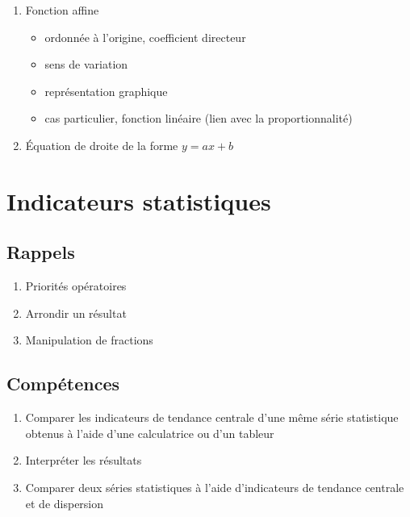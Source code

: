 \documentclass[12pt,a4paper]{article}
\begin{document}
\begin{enumerate}
	
	\item Fonction affine
	\begin{itemize}
		\item ordonnée à l'origine, coefficient directeur
		\item sens de variation
		\item représentation graphique
		\item cas particulier, fonction linéaire (lien avec la proportionnalité)
		
	\end{itemize}
	\item \'Equation de droite de la forme $y=ax+b$
\end{enumerate}

\section{Indicateurs statistiques}\label{ch:2:indicateurs}


\subsection*{Rappels}
	\begin{enumerate}
		\item Priorités opératoires
		\item Arrondir un résultat
		\item Manipulation de fractions
	\end{enumerate}
\subsection*{Compétences}
	\begin{enumerate}
		\item Comparer les indicateurs de tendance centrale d'une même série statistique obtenus à l'aide d'une calculatrice ou d'un tableur
		\item Interpréter les résultats
		\item Comparer deux séries statistiques à l'aide d'indicateurs de tendance centrale et de dispersion
	\end{enumerate}
\end{document}
